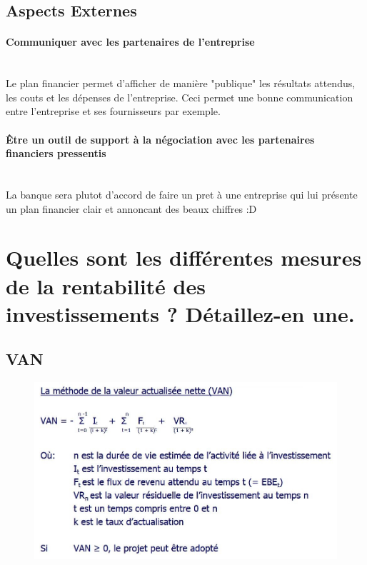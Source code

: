\documentclass{article}
\begin{document}
	\subsection{Aspects Externes}
		\paragraph{Communiquer avec les partenaires de l’entreprise}~\\
			Le plan financier permet d'afficher de manière "publique" les résultats attendus, les couts et les dépenses de l'entreprise. Ceci permet une bonne communication entre l'entreprise et ses fournisseurs par exemple.
		\paragraph{Être un outil de support à la négociation avec les partenaires financiers pressentis}~\\
			La banque sera plutot d'accord de faire un pret à une entreprise qui lui présente un plan financier clair et annoncant des beaux chiffres :D 
			

\section{Quelles sont les différentes mesures de la rentabilité des investissements ? Détaillez-en une.}\label{mesureRentabilite}
\subsection{VAN}
\begin{figure}[H]
	\centering
	\includegraphics[width=14cm]{van.jpg}
\end{figure}
\end{document}
